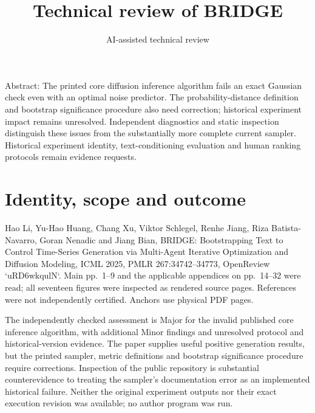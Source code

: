 \documentclass[10pt]{article}
\title{Technical review of BRIDGE}
\author{AI-assisted technical review}
\date{}
\begin{document}
\maketitle
Abstract: The printed core diffusion inference algorithm fails an exact Gaussian check even with an optimal noise predictor. The probability-distance definition and bootstrap significance procedure also need correction; historical experiment impact remains unresolved. Independent diagnostics and static inspection distinguish these issues from the substantially more complete current sampler. Historical experiment identity, text-conditioning evaluation and human ranking protocols remain evidence requests.\par
\section*{Identity, scope and outcome}
Hao Li, Yu-Hao Huang, Chang Xu, Viktor Schlegel, Renhe Jiang, Riza Batista-Navarro, Goran Nenadic and Jiang Bian, BRIDGE: Bootstrapping Text to Control Time-Series Generation via Multi-Agent Iterative Optimization and Diffusion Modeling, ICML 2025, PMLR 267:34742–34773, OpenReview `uRD6wkqulN`. Main pp. 1–9 and the applicable appendices on pp. 14–32 were read; all seventeen figures were inspected as rendered source pages. References were not independently certified. Anchors use physical PDF pages.\par
The independently checked assessment is Major for the invalid published core inference algorithm, with additional Minor findings and unresolved protocol and historical-version evidence. The paper supplies useful positive generation results, but the printed sampler, metric definitions and bootstrap significance procedure require corrections. Inspection of the public repository is substantial counterevidence to treating the sampler’s documentation error as an implemented historical failure. Neither the original experiment outputs nor their exact execution revision was available; no author program was run.\par
\end{document}
